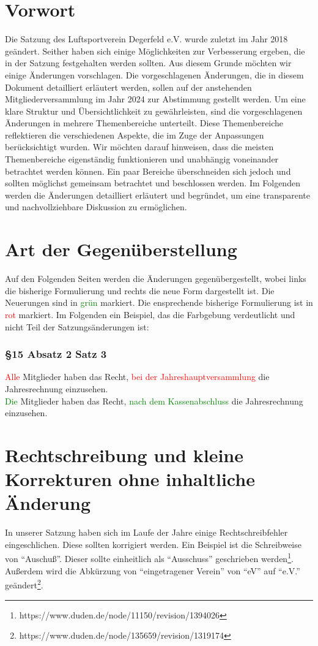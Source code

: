 \documentclass[10pt,a4paper,parskip=half]{scrartcl}
\newcommand{\new}[1]{\textcolor{Green}{#1}}
\newcommand{\old}[1]{\textcolor{Red}{#1}}
\newcommand{\change}[1]{
  \begin{adjustwidth}{20pt}{20pt}
    #1
  \end{adjustwidth}
}
\newcommand{\compare}[3]{\change{\subsubsection*{#1}\begin{multicols}{2}#2\columnbreak\\#3\end{multicols}}}
\begin{document}
\clearpage


\section*{Vorwort}
Die Satzung des Luftsportverein Degerfeld e.V. wurde zuletzt im Jahr 2018 geändert. Seither haben sich einige Möglichkeiten zur Verbesserung ergeben, die in der Satzung festgehalten werden sollten. Aus diesem Grunde möchten wir einige Änderungen vorschlagen. Die vorgeschlagenen Änderungen, die in diesem Dokument detailliert erläutert werden, sollen auf der anstehenden Mitgliederversammlung im Jahr 2024 zur Abstimmung gestellt werden. Um eine klare Struktur und Übersichtlichkeit zu gewährleisten, sind die vorgeschlagenen Änderungen in mehrere Themenbereiche unterteilt. Diese Themenbereiche reflektieren die verschiedenen Aspekte, die im Zuge der Anpassungen berücksichtigt wurden. Wir möchten darauf hinweisen, dass die meisten Themenbereiche eigenständig funktionieren und unabhängig voneinander betrachtet werden können. Ein paar Bereiche überschneiden sich jedoch und sollten möglichst gemeinsam betrachtet und beschlossen werden. Im Folgenden werden die Änderungen detailliert erläutert und begründet, um eine transparente und nachvollziehbare Diskussion zu ermöglichen.


\tableofcontents
\clearpage

\section*{Art der Gegenüberstellung}

Auf den Folgenden Seiten werden die Änderungen gegenübergestellt, wobei links die bisherige Formulierung und rechts die neue Form dargestellt ist. Die Neuerungen sind in \new{grün} markiert. Die ensprechende bisherige Formulierung ist in \old{rot} markiert. Im Folgenden ein Beispiel, das die Farbgebung verdeutlicht und nicht Teil der Satzungsänderungen ist:

\compare{§15 Absatz 2 Satz 3}
{\old{Alle} Mitglieder haben das Recht, \old{bei der Jahreshauptversammlung} die Jahresrechnung einzusehen.}
{\new{Die} Mitglieder haben das Recht, \new{nach dem Kassenabschluss} die Jahresrechnung einzusehen.}


\section{Rechtschreibung und kleine Korrekturen ohne inhaltliche Änderung}
In unserer Satzung haben sich im Laufe der Jahre einige Rechtschreibfehler eingeschlichen. Diese sollten korrigiert werden.
Ein Beispiel ist die Schreibweise von "`Auschuß"'. Dieser sollte einheitlich als "`Ausschuss"' geschrieben werden\footnote{https://www.duden.de/node/11150/revision/1394026}.
Außerdem wird die Abkürzung von "`eingetragener Verein"' von "`eV"' auf "`e.V."' geändert\footnote{https://www.duden.de/node/135659/revision/1319174}.
\end{document}
